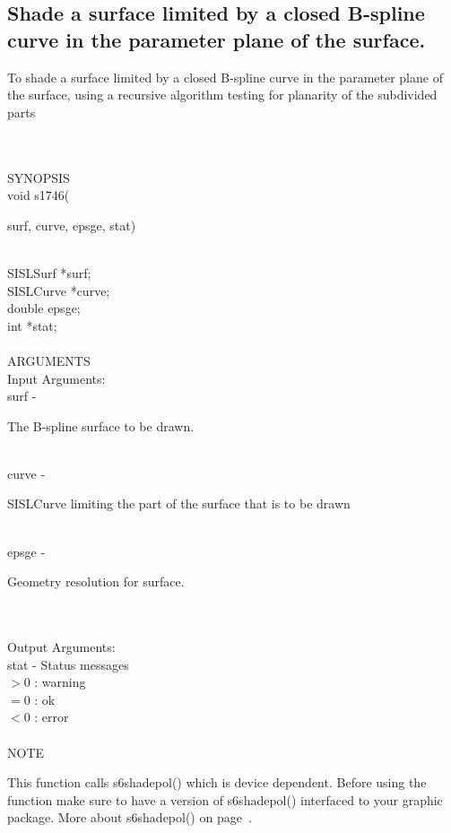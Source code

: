 \subsection{Shade a surface limited by a closed B-spline 
curve in the parameter plane of the surface.}
\begin{minipg1}
To shade a surface 
limited by a closed B-spline 
curve in the parameter plane of the surface, using a recursive algorithm testing for 
planarity of the subdivided parts
\end{minipg1} \\ \\
SYNOPSIS\\
	\>void s1746(\begin{minipg3}
		{\fov surf}, {\fov curve}, {\fov epsge}, {\fov stat})
		\end{minipg3}\\[0.3ex]
		\>\>	SISLSurf	\> 	*{\fov surf};\\
		\>\>	SISLCurve	\>	*{\fov curve};\\
		\>\>	double	\>	{\fov epsge};\\
		\>\>	int 	\>	*{\fov stat};\\
\\
ARGUMENTS\\
	\>Input Arguments:\\
	\>\>	{\fov surf}\> - \>	\begin{minipg2}
				The B-spline surface to be drawn.
				\end{minipg2}\\
	\>\>	{\fov curve}\> - \>	\begin{minipg2}
				SISLCurve limiting the part of the surface that is to be drawn
				\end{minipg2}\\[0.8ex]
	\>\>	{\fov epsge}\> - \>	\begin{minipg2}
				Geometry resolution for surface.
				\end{minipg2}\\
\\
	\>Output Arguments:\\
	\>\>	{\fov stat}	\> - \>	Status messages\\
		\>\>\>\>\>		$> 0$	: warning\\
		\>\>\>\>\>		$= 0$	: ok\\
		\>\>\>\>\>		$< 0$	: error\\
\\
NOTE\\
\>\begin{minipg6}
This function calls s6shadepol() which
is device dependent. Before using the function make sure 
to have a version of s6shadepol() 
interfaced to your graphic package.
More about s6shadepol() on page~\pageref{s6shadepol}.
\end{minipg6}
